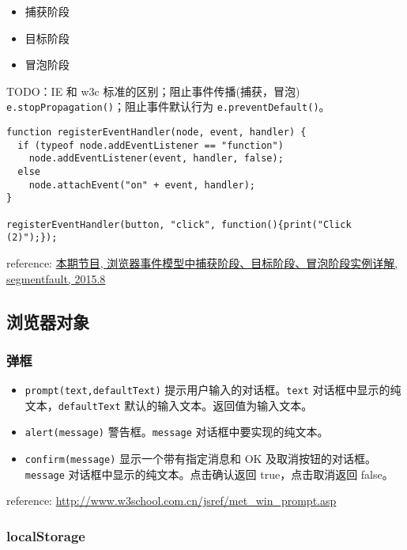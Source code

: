 \begin{itemize}
\item 捕获阶段
\item 目标阶段
\item 冒泡阶段
\end{itemize}

TODO：IE 和 w3c 标准的区别；阻止事件传播(捕获，冒泡) \texttt{e.stopPropagation()}；阻止事件默认行为 \texttt{e.preventDefault()}。

\begin{verbatim}function registerEventHandler(node, event, handler) {
  if (typeof node.addEventListener == "function")
    node.addEventListener(event, handler, false);
  else
    node.attachEvent("on" + event, handler);
}

registerEventHandler(button, "click", function(){print("Click (2)");});
\end{verbatim}

reference: \href{http://segmentfault.com/a/1190000003482372}{本期节目, 浏览器事件模型中捕获阶段、目标阶段、冒泡阶段实例详解, segmentfault, 2015.8}

\subsection{浏览器对象}\hypertarget{section-10}{}\label{section-10}

\subsubsection{弹框}\hypertarget{section-11}{}\label{section-11}

\begin{itemize}
\item \texttt{prompt(text,defaultText)} 提示用户输入的对话框。\texttt{text} 对话框中显示的纯文本，\texttt{defaultText} 默认的输入文本。返回值为输入文本。
\item \texttt{alert(message)} 警告框。\texttt{message} 对话框中要实现的纯文本。
\item \texttt{confirm(message)} 显示一个带有指定消息和 OK 及取消按钮的对话框。\texttt{message} 对话框中显示的纯文本。点击确认返回 true，点击取消返回 false。
\end{itemize}

reference: \href{http://www.w3school.com.cn/jsref/met\_win\_prompt.asp}{http://www.w3school.com.cn/jsref/met\_win\_prompt.asp}

\subsubsection{localStorage}\hypertarget{localstorage}{}\label{localstorage}

